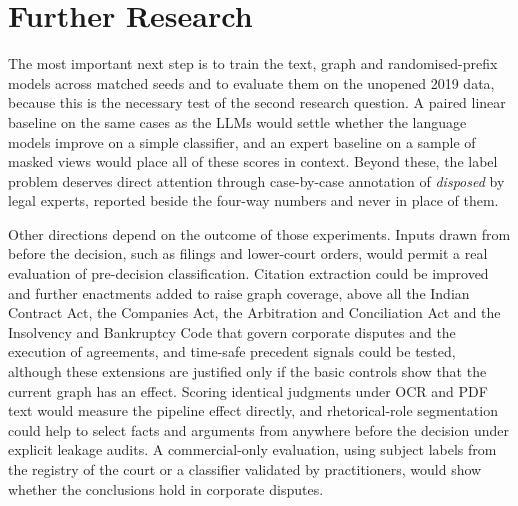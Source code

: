 \documentclass[journal]{IEEEtran}
\newcommand{\cls}[1]{\emph{#1}}
\begin{document}
\section{Further Research}\label{sec:future}
The most important next step is to train the text, graph and randomised-prefix models across matched seeds and to evaluate them on the unopened 2019 data, because this is the necessary test of the second research question. A paired linear baseline on the same cases as the LLMs would settle whether the language models improve on a simple classifier, and an expert baseline on a sample of masked views would place all of these scores in context. Beyond these, the label problem deserves direct attention through case-by-case annotation of \cls{disposed} by legal experts, reported beside the four-way numbers and never in place of them.

Other directions depend on the outcome of those experiments. Inputs drawn from before the decision, such as filings and lower-court orders, would permit a real evaluation of pre-decision classification. Citation extraction could be improved and further enactments added to raise graph coverage, above all the Indian Contract Act, the Companies Act, the Arbitration and Conciliation Act and the Insolvency and Bankruptcy Code that govern corporate disputes and the execution of agreements, and time-safe precedent signals \cite{r50} could be tested, although these extensions are justified only if the basic controls show that the current graph has an effect. Scoring identical judgments under OCR and PDF text would measure the pipeline effect directly, and rhetorical-role segmentation \cite{r41} could help to select facts and arguments from anywhere before the decision under explicit leakage audits. A commercial-only evaluation, using subject labels from the registry of the court or a classifier validated by practitioners, would show whether the conclusions hold in corporate disputes.
\end{document}
